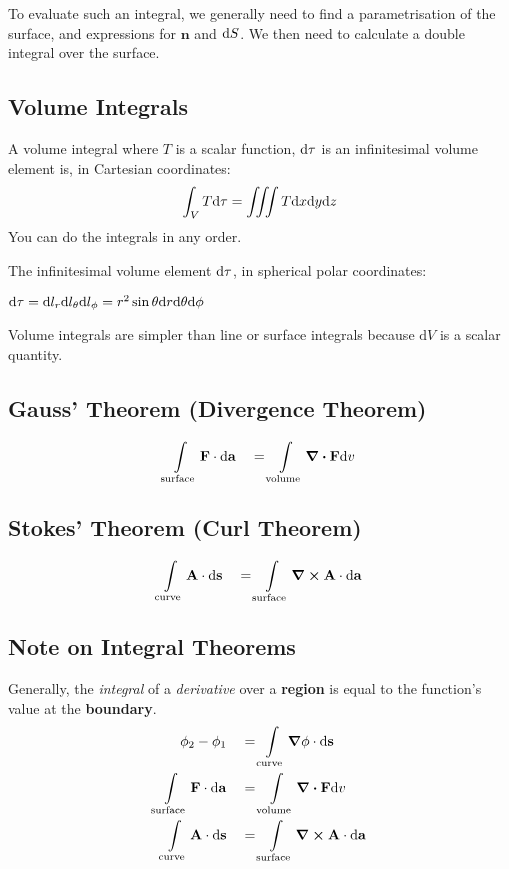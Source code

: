 To evaluate such an integral, we generally need to find a parametrisation of the surface, and expressions for $\mathbf{n}$ and $\differential S$. We
then need to calculate a double integral over the surface.

\subsection*{Volume Integrals}
A volume integral where $T$ is a scalar function, $\differential \tau$ is an infinitesimal volume element is, in Cartesian coordinates:
\begin{equation*}
    \int_{V} T \differential \tau = \iiint T \differential x \differential y \differential z
\end{equation*}
You can do the integrals in any order. 

The infinitesimal volume element $\differential \tau$, in spherical polar coordinates:

$\differential \tau = \differential l_r \differential l_\theta \differential l_\phi = r^2 \sin \theta \differential r \differential \theta \differential \phi$

Volume integrals are simpler than line or surface integrals because $\mathrm{d}V$ is a scalar quantity.

\subsection*{Gauss' Theorem (Divergence Theorem)}
\begin{equation*}
    \int\limits_{\mathrm{surface}} \mathbf{F} \cdot \differential \mathbf{a} \quad = \int\limits_{\mathrm{volume}} \divergence \mathbf{F} \differential v
\end{equation*}
\subsection*{Stokes' Theorem (Curl Theorem)}
\begin{equation*}
    \int\limits_{\mathrm{curve}} \mathbf{A} \cdot \differential \mathbf{s} \quad = \int\limits_{\mathrm{surface}} \curl \mathbf{A} \cdot \differential \mathbf{a}
\end{equation*}
\subsection*{Note on Integral Theorems}
Generally, the \textit{integral} of a \textit{derivative} over a \textbf{region} is equal to the function's value at the \textbf{boundary}.
\begin{equation*}
    \begin{aligned}
    \phi_2 - \phi_1 \quad &= \int\limits_{\mathrm{curve}} \grad \phi \cdot \differential \mathbf{s} \\
    \int\limits_{\mathrm{surface}} \mathbf{F} \cdot \differential \mathbf{a} \quad &= \int\limits_{\mathrm{volume}} \divergence \mathbf{F} \differential v \\
    \int\limits_{\mathrm{curve}} \mathbf{A} \cdot \differential \mathbf{s} \quad &= \int\limits_{\mathrm{surface}} \curl \mathbf{A} \cdot \differential \mathbf{a}
\end{aligned}
\end{equation*}
